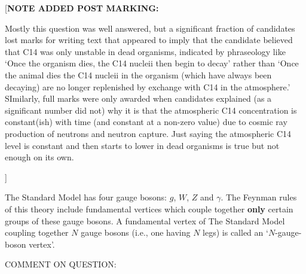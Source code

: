 \documentclass[txfonts]{NSTexam}
\newcommand\ANS[1]{{

\answer %


{\color{blue}
#1
}
 
\endanswer

}}
\newcommand\POSTMARKING[1]{{

{\color{magenta}
[\textbf{NOTE ADDED POST MARKING:}

#1
]
}
}}
\begin{document}
\begin{questions}
{\POSTMARKING{
Mostly this question was well answered, but a significant fraction of candidates lost marks for writing text that appeared to imply that the candidate believed that C14 was only unstable in dead organisms, indicated by phraseology like `Once the organism dies, the C14 nucleii then begin to decay' rather than `Once the animal dies the C14 nucleii in the organism (which have always been decaying) are no longer replenished by exchange with C14 in the atmosphere.' SImilarly, full marks were only awarded when candidates explained (as a significant number did not) why it is that the atmospheric C14 concentration is constant(ish) with time (and constant at a non-zero value) due to cosmic ray production of neutrons and neutron capture. Just saying the atmospheric C14 level is constant and then starts to lower in dead organisms is true but not enough on its own. 
}
}

\question
The Standard Model has four gauge bosons:  $g$, $W$, $Z$ and $\gamma$.  The  Feynman rules of this theory include fundamental vertices which couple together \textbf{only} certain groups of these gauge bosons.  A fundamental vertex of The Standard Model coupling together $N$ gauge bosons (i.e., one having $N$ legs) is called an `$N$-gauge-boson vertex'.
 
\ANS{
\clearpage

COMMENT ON QUESTION:

}
\end{questions}
\end{document}
